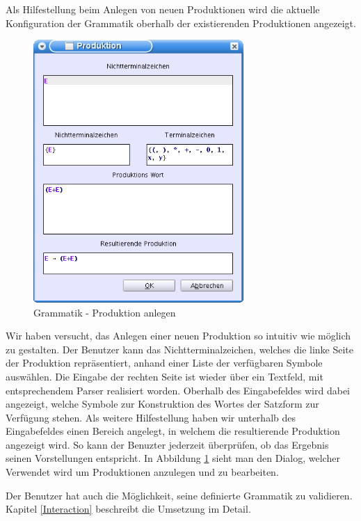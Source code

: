 Als Hilfestellung beim Anlegen von neuen Produktionen wird die aktuelle
Konfiguration der Grammatik oberhalb der existierenden Produktionen
angezeigt.\vspace{10pt}


\begin{figure}[h!]
\begin{center}
\includegraphics[width=8cm]{../images/production_dialog.png}
\caption{Grammatik - Produktion anlegen}
\label{FigureAddProduction}
\end{center}
\end{figure}
\vspace{10pt}

Wir haben versucht, das Anlegen einer neuen Produktion so intuitiv wie möglich
zu gestalten. Der Benutzer kann das Nichtterminalzeichen, welches die linke
Seite der Produktion repräsentiert, anhand einer Liste der
verfügbaren Symbole auswählen. Die Eingabe der rechten Seite ist
wieder über ein Textfeld, mit entsprechendem Parser realisiert
worden. Oberhalb des Eingabefeldes wird dabei angezeigt, welche Symbole zur
Konstruktion des Wortes der Satzform zur Verfügung stehen. Als weitere
Hilfestellung haben wir unterhalb des Eingabefeldes einen Bereich angelegt,
in welchem die resultierende Produktion angezeigt wird. So kann der
Benuzter jederzeit überprüfen, ob das Ergebnis seinen
Vorstellungen entspricht. In Abbildung \ref{FigureAddProduction}
sieht man den Dialog, welcher Verwendet wird um Produktionen
anzulegen und zu bearbeiten.\vspace{10pt}

Der Benutzer hat auch die Möglichkeit, seine definierte Grammatik zu validieren.
Kapitel \ref{Interaction} beschreibt die Umsetzung im Detail.\vspace{10pt}
